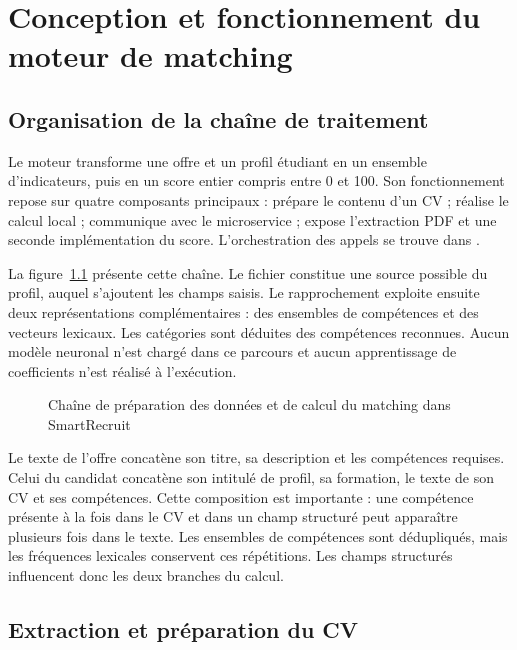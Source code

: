 \chapter{Conception et fonctionnement du moteur de matching}
\label{chap:moteur}

\section{Organisation de la chaîne de traitement}

Le moteur transforme une offre et un profil étudiant en un ensemble d'indicateurs, puis en un score entier compris entre 0 et 100. Son fonctionnement repose sur quatre composants principaux :  prépare le contenu d'un CV ;  réalise le calcul local ;  communique avec le microservice ;  expose l'extraction PDF et une seconde implémentation du score. L'orchestration des appels se trouve dans .

La figure~\ref{fig:matching-pipeline} présente cette chaîne. Le fichier constitue une source possible du profil, auquel s'ajoutent les champs saisis. Le rapprochement exploite ensuite deux représentations complémentaires : des ensembles de compétences et des vecteurs lexicaux. Les catégories sont déduites des compétences reconnues. Aucun modèle neuronal n'est chargé dans ce parcours et aucun apprentissage de coefficients n'est réalisé à l'exécution.

\begin{figure}[htbp]
\centering

\caption{Chaîne de préparation des données et de calcul du matching dans SmartRecruit}
\label{fig:matching-pipeline}
\end{figure}

Le texte de l'offre concatène son titre, sa description et les compétences requises. Celui du candidat concatène son intitulé de profil, sa formation, le texte de son CV et ses compétences. Cette composition est importante : une compétence présente à la fois dans le CV et dans un champ structuré peut apparaître plusieurs fois dans le texte. Les ensembles de compétences sont dédupliqués, mais les fréquences lexicales conservent ces répétitions. Les champs structurés influencent donc les deux branches du calcul.

\section{Extraction et préparation du CV}

